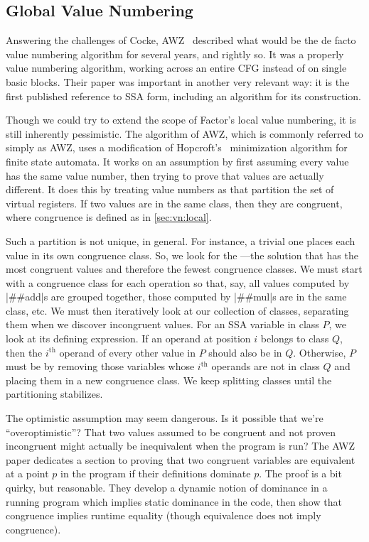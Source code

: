 \subsection{Global Value Numbering}\label{sec:vn:global}

Answering the challenges of Cocke, AWZ~
described what would be the de facto value numbering algorithm for several
years, and rightly so.  It was a properly  value numbering
algorithm, working across an entire \gls{CFG} instead of on single basic
blocks.  Their paper was important in another very relevant way: it is the
first published reference to SSA form, including an
algorithm for its construction.

Though we could try to extend the scope of Factor's local value numbering, it
is still inherently pessimistic.  The algorithm of AWZ, which
is commonly referred to simply as AWZ, uses a modification of
Hopcroft's~ minimization algorithm for finite state automata.
It works on an  assumption by first assuming every value has
the same value number, then trying to prove that values are actually different.
It does this by treating value numbers as  that
partition the set of virtual registers.  If two values are in the same class,
then they are congruent, where congruence is defined as in \cref{sec:vn:local}.

Such a partition is not unique, in general.  For instance, a trivial one places
each value in its own congruence class.  So, we look for the ---the solution that has the most congruent values and therefore
the fewest congruence classes.  We must start with a congruence class for each
operation so that, say, all values computed by \factor|##add|s are grouped
together, those computed by \factor|##mul|s are in the same class, etc.  We
must then iteratively look at our collection of classes, separating them when
we discover incongruent values.  For an \gls{SSA} variable in class $P$, we
look at its defining expression.  If an operand at position $i$ belongs to
class $Q$, then the $i^\text{th}$ operand of every other value in $P$ should
also be in $Q$.  Otherwise, $P$ must be  by removing those
variables whose $i^\text{th}$ operands are not in class $Q$ and placing them in
a new congruence class.  We keep splitting classes until the partitioning
stabilizes.

The optimistic assumption may seem dangerous.  Is it possible that we're
``overoptimistic''?  That two values assumed to be congruent and not proven
incongruent might actually be inequivalent when the program is run?  The
AWZ~ paper dedicates a section to proving that two congruent
variables are equivalent at a point $p$ in the program if their definitions
dominate $p$.  The proof is a bit quirky, but reasonable.  They develop a
dynamic notion of dominance in a running program which implies static dominance
in the code, then show that congruence implies runtime equality (though
equivalence does not imply congruence).

